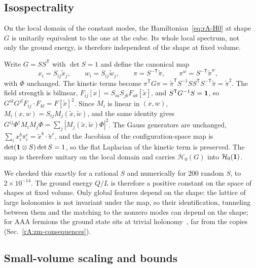 \subsection{Isospectrality}
\label{rA:zm-isospectral}

\begin{rAprop}\label{prop:rA-isospectral}
On the local domain of the constant modes, the Hamiltonian~\eqref{eq:rA-H0} at shape $G$ is unitarily equivalent to the one at the cube.
Its whole local spectrum, not only the ground energy, is therefore independent of the shape at fixed volume.
\end{rAprop}

\begin{rAproof}
Write $G=SS^{\mathsf T}$ with $\det S=1$ and define the canonical map
\begin{equation}
x_i=S_{ij}\tilde x_j,\qquad w_i=S_{ij}\tilde w_j,\qquad \pi=S^{-\mathsf T}\tilde\pi,\qquad \pi^w=S^{-\mathsf T}\tilde\pi^w,
\label{eq:rA-isomap}
\end{equation}
with $\Phi$ unchanged.
The kinetic terms become $\pi^{\mathsf T}G\pi=\tilde\pi^{\mathsf T}S^{-1}SS^{\mathsf T}S^{-\mathsf T}\tilde\pi=\tilde\pi^2$.
The field strength is bilinear, $F_{ij}[x]=S_{ia}S_{jb}F_{ab}[\tilde x]$, and $S^{\mathsf T}G^{-1}S=\mathbf{1}$, so $G^{ik}G^{jl}F_{ij}\cdot F_{kl}=F[\tilde x]^2$.
Since $M_i$ is linear in $(x,w)$, $M_i(x,w)=S_{ij}M_j(\tilde x,\tilde w)$, and the same identity gives $G^{ij}\Phi^\dagger M_iM_j\Phi=\sum_j|M_j(\tilde x,\tilde w)\Phi|^2$.
The Gauss generators are unchanged, $\sum_ix_i^b\pi_i^c=\tilde x^b\cdot\tilde\pi^c$, and the Jacobian of the configuration-space map is $\det(\mathbf{1}\otimes S)\det S=1$, so the flat Laplacian of the kinetic term is preserved.
The map is therefore unitary on the local domain and carries $\mathcal H_0(G)$ into $\mathcal H_0(\mathbf{1})$.
\end{rAproof}

We checked this exactly for a rational $S$ and numerically for 200 random $S$, to $2\times10^{-14}$. %
The ground energy $Q/L$ is therefore a positive constant on the space of shapes at fixed volume.
Only global features depend on the shape: the lattice of large holonomies is not invariant under the map, so their identification, tunneling between them and the matching to the nonzero modes can depend on the shape; for AAA fermions the ground state sits at trivial holonomy~\cite{vanBaal:1988va}, far from the copies (Sec.~\ref{rA:zm-consequences}).

\subsection{Small-volume scaling and bounds}
\label{rA:zm-bounds}

